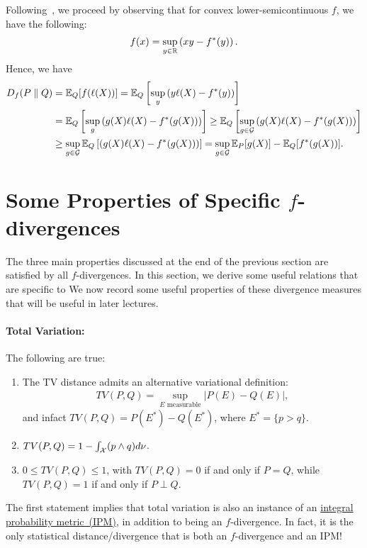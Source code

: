 \documentclass[12pt]{article}
\begin{document}
Following~\cite{nguyen2010estimating}, we proceed by observing that for convex lower-semicontinuous $f$, we have the following: 
\begin{align}
f(x) = \sup_{y \in \mathbb{R}} \left( xy - f^*(y) \right).  
\end{align}
Hence, we have 
\begin{align}
D_f(P \parallel Q) &= \mathbb{E}_Q[f(\ell(X))] = \mathbb{E}_Q\left[ \sup_{y} \left( y \ell(X) - f^*(y) \right)  \right]  \\
& = \mathbb{E}_Q\left[ \sup_{g} \left( g(X) \ell(X) - f^*(g(X))  \right) \right] \geq  \mathbb{E}_Q\left[ \sup_{g \in \mathcal{G}} \left( g(X) \ell(X) - f^*(g(X))  \right) \right] \\
&  \geq \sup_{g \in \mathcal{G}} \mathbb{E}_Q\left[  \left( g(X) \ell(X) - f^*(g(X))  \right) \right] = \sup_{g \in \mathcal{G}} \mathbb{E}_P[g(X)] - \mathbb{E}_Q[f^*(g(X))]. 
\end{align}




\section{Some Properties of Specific $f$-divergences}
\label{sec:specific-f-divs-elementary-properties}
The three main properties discussed at the end of the previous section are satisfied by all $f$-divergences. In this section, we derive some useful relations that are specific to 
We now record some useful properties of these divergence measures that will be useful in later lectures. 

\paragraph{Total Variation:} The following are true: 
		\begin{enumerate}
			\item The TV distance admits an alternative variational definition: 
			\begin{align}
				TV(P, Q) = \sup_{E \text{ measurable}} |P(E) - Q(E)|, 
			\end{align}
			and infact $TV(P, Q) = P(E^*) - Q(E^*)$, where $E^* = \{p>q\}$. 
			\item $TV(P, Q) = 1 - \int_{{\cal X}} (p \wedge q) d\nu$. 
			\item $0 \leq TV(P, Q) \leq 1$, with $TV(P, Q) = 0$ if and only if $P = Q$, while $TV(P, Q)=1$ if and only if $P \perp Q$. 
		\end{enumerate}
	The first statement implies that total variation is also an instance of an \href{https://en.wikipedia.org/wiki/Integral_probability_metric}{integral probability metric~(IPM)}, in addition to being an $f$-divergence. In fact, it is the only statistical distance/divergence that is both an $f$-divergence and an IPM! 
\end{document}

